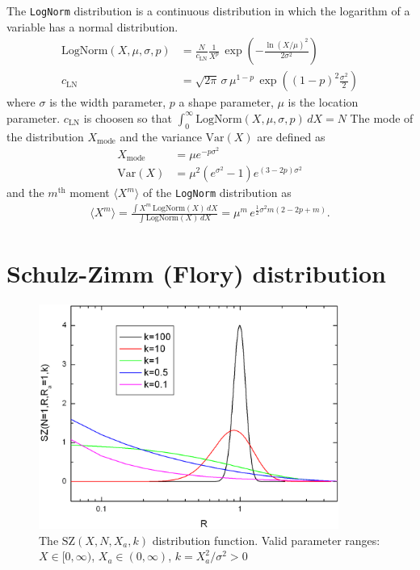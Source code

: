 The \texttt{LogNorm} distribution is a continuous distribution in
which the logarithm of a variable has a normal distribution.
\begin{subequations}
\begin{align}
\text{LogNorm}(X,\mu,\sigma,p) &=  \frac{N}{c_\text{LN}}
                                    \frac{1}{X^{p}}\,
                                    \exp\!\!\left(-\frac{\ln(X/\mu)^2}{2\sigma^2}\right) \\
c_\text{LN} &= \sqrt{2\pi}\,\sigma \,\mu^{1-p}
\,\exp\!\!\left((1-p)^2\frac{\sigma^2}{2}\right)
\label{eq:LogNormal}
\end{align}
\end{subequations}
where $\sigma$ is the width parameter, $p$ a shape parameter, $\mu$ is the location parameter.
$c_\text{LN}$ is choosen so that $\int_0^\infty\! \text{LogNorm}(X,\mu,\sigma,p)\,dX = N$
The mode of the distribution $X_\text{mode}$ and the variance
$\text{Var}(X)$ are defined as
\begin{align}
X_\text{mode} &= \mu e^{-p \sigma^2} \\
\text{Var}(X) &= \mu ^2 \left(e^{\sigma^2}-1\right) e^{(3-2 p) \sigma^2}
\end{align}
and the $m^\text{th}$ moment $\langle X^m\rangle$ of the \texttt{LogNorm} distribution as
\begin{align}
\langle X^m\rangle = \frac{\int X^m\, \textrm{LogNorm}(X)\, dX}{\int \textrm{LogNorm}(X)\, dX} =
\mu^m \, e^{\frac{1}{2} \sigma^2 m (2 - 2 p + m)}.
\label{eq:nMoment:LogNormal}
\end{align}

\clearpage
\section{Schulz-Zimm (Flory) distribution}

\begin{figure}[htb]
\begin{center}
\includegraphics[width=0.876\textwidth,height=0.658\textwidth]{SZ.png}
\end{center}
\caption{The $\text{SZ}(X,N,X_a,k)$ distribution function. Valid
parameter ranges: $X \in [0,\infty)$, $X_a \in (0,\infty)$,
$k=X_a^2/\sigma^2 > 0$} \label{NogNormal}
\end{figure}

